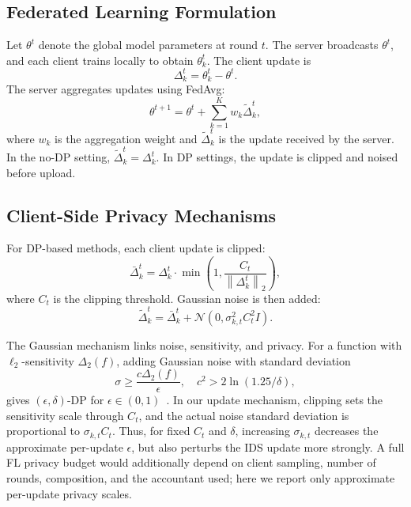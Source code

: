 \documentclass[conference]{IEEEtran}
\begin{document}
\subsection{Federated Learning Formulation}

Let \(\theta^t\) denote the global model parameters at round \(t\). The server
broadcasts \(\theta^t\), and each client trains locally to obtain
\(\theta_k^t\). The client update is
\[
\Delta_k^t = \theta_k^t - \theta^t.
\]
The server aggregates updates using FedAvg:
\[
\theta^{t+1} = \theta^t + \sum_{k=1}^{K} w_k \widetilde{\Delta}_k^t,
\]
where \(w_k\) is the aggregation weight and \(\widetilde{\Delta}_k^t\) is the
update received by the server. In the no-DP setting,
\(\widetilde{\Delta}_k^t=\Delta_k^t\). In DP settings, the update is clipped and
noised before upload.

\subsection{Client-Side Privacy Mechanisms}

For DP-based methods, each client update is clipped:
\[
\bar{\Delta}_k^t =
\Delta_k^t \cdot
\min\left(1, \frac{C_t}{\left\lVert \Delta_k^t \right\rVert_2}\right),
\]
where \(C_t\) is the clipping threshold. Gaussian noise is then added:
\[
\widetilde{\Delta}_k^t =
\bar{\Delta}_k^t + \mathcal{N}\left(0, \sigma_{k,t}^{2} C_t^{2} I\right).
\]

The Gaussian mechanism links noise, sensitivity, and privacy. For a function
with \(\ell_2\)-sensitivity \(\Delta_2(f)\), adding Gaussian noise with standard
deviation
\[
\sigma \geq \frac{c\Delta_2(f)}{\epsilon},
\quad c^2 > 2\ln(1.25/\delta),
\]
gives \((\epsilon,\delta)\)-DP for \(\epsilon \in
(0,1)\)~\cite{dwork2006ourdata,dwork2014algorithmic}. In our update mechanism,
clipping sets the sensitivity scale through \(C_t\), and the actual noise
standard deviation is proportional to \(\sigma_{k,t}C_t\). Thus, for fixed
\(C_t\) and \(\delta\), increasing \(\sigma_{k,t}\) decreases the approximate
per-update \(\epsilon\), but also perturbs the IDS update more strongly. A full
FL privacy budget would additionally depend on client sampling, number of
rounds, composition, and the accountant used; here we report only approximate
per-update privacy scales.
\end{document}
